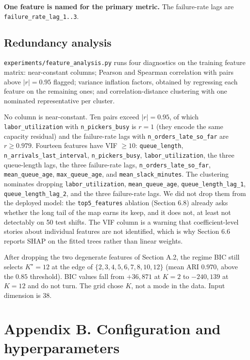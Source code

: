 \documentclass[review,3p,times]{elsarticle}
\theoremstyle{definition}
\begin{document}
\textbf{One feature is named for the primary metric.} The failure-rate
lags are \texttt{failure\_rate\_lag\_1..3}.

\subsection{Redundancy analysis}\label{redundancy-analysis}

\texttt{experiments/feature\_analysis.py} runs four diagnostics on the
training feature matrix: near-constant columns; Pearson and Spearman
correlation with pairs above \(|r| = 0.95\) flagged; variance inflation
factors, obtained by regressing each feature on the remaining ones; and
correlation-distance clustering with one nominated representative per
cluster.

No column is near-constant. Ten pairs exceed \(|r|=0.95\), of which
\texttt{labor\_utilization} with \texttt{n\_pickers\_busy} is \(r=1\)
(they encode the same capacity residual) and the failure-rate lags with
\texttt{n\_orders\_late\_so\_far} are \(r \ge 0.979\). Fourteen features
have VIF \(\ge 10\): \texttt{queue\_length},
\texttt{n\_arrivals\_last\_interval}, \texttt{n\_pickers\_busy},
\texttt{labor\_utilization}, the three queue-length lags, the three
failure-rate lags, \texttt{n\_orders\_late\_so\_far},
\texttt{mean\_queue\_age}, \texttt{max\_queue\_age}, and
\texttt{mean\_slack\_minutes}. The clustering nominates dropping
\texttt{labor\_utilization}, \texttt{mean\_queue\_age},
\texttt{queue\_length\_lag\_1}, \texttt{queue\_length\_lag\_2}, and the
three failure-rate lags. We did not drop them from the deployed model:
the \texttt{top5\_features} ablation (Section 6.8) already asks whether
the long tail of the map earns its keep, and it does not, at least not
detectably on 50 test shifts. The VIF column is a warning that
coefficient-level stories about individual features are not identified,
which is why Section 6.6 reports SHAP on the fitted trees rather than
linear weights.

After dropping the two degenerate features of Section A.2, the regime
BIC still selects \(K^\star=12\) at the edge of
\(\{2,3,4,5,6,7,8,10,12\}\) (mean ARI \(0.970\), above the \(0.85\)
threshold). BIC values fall from \(+36{,}871\) at \(K=2\) to
\(-240{,}139\) at \(K=12\) and do not turn. The grid chose \(K\), not a
mode in the data. Input dimension is \(38\).

\section{Appendix B. Configuration and
hyperparameters}\label{appendix-b.-configuration-and-hyperparameters}
\end{document}

